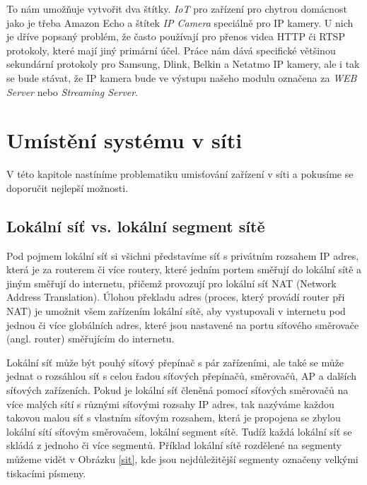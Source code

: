 \documentclass[thesis=B,czech,hidelinks]{FITthesis}[2019/03/21]
\begin{document}
        To nám umožňuje vytvořit dva štítky. \emph{IoT} pro zařízení pro chytrou domácnost jako je třeba Amazon Echo a štítek \emph{IP Camera} speciálně pro IP kamery. U nich je dříve popsaný problém, že často používají pro přenos videa HTTP či RTSP protokoly, které mají jiný primární účel. Práce \cite{IoT} nám dává specifické většinou sekundární protokoly pro Samsung, Dlink, Belkin a Netatmo IP kamery, ale i tak se bude stávat, že IP kamera bude ve výstupu našeho modulu označena za \emph{WEB Server} nebo \emph{Streaming Server}. 
\chapter{Umístění systému v síti}
V této kapitole nastíníme problematiku umisťování zařízení v síti a pokusíme se doporučit nejlepší možnosti.
    \section{Lokální síť vs. lokální segment sítě}
    Pod pojmem lokální síť si všichni představíme síť s privátním rozsahem IP adres, která je za routerem či více routery, které jedním portem směřují do lokální sítě a jiným směřují do internetu, přičemž provozují pro lokální síť NAT (Network Address Translation). Úlohou překladu adres (proces, který provádí router při NAT) je umožnit všem zařízením lokální sítě, aby vystupovali v internetu pod jednou či více globálních adres, které jsou nastavené na portu síťového směrovače (angl. router) směřujícím do internetu.
    
    Lokální síť může být pouhý síťový přepínač s pár zařízeními, ale také se může jednat o rozsáhlou síť s celou řadou síťových přepínačů, směrovačů, AP a dalších síťových zařízeních. Pokud je lokální síť členěná pomocí síťových směrovačů na více malých sítí s různými síťovými rozsahy IP adres, tak nazýváme každou takovou malou síť s vlastním síťovým rozsahem, která je propojena se zbylou lokální sítí síťovým směrovačem, lokální segment sítě. Tudíž každá lokální síť se skládá z jednoho či více segmentů. Příklad lokální sítě rozdělené na segmenty můžeme vidět v Obrázku \ref{sit}, kde jsou nejdůležitější segmenty označeny velkými tiskacími písmeny.
    
\end{document}
